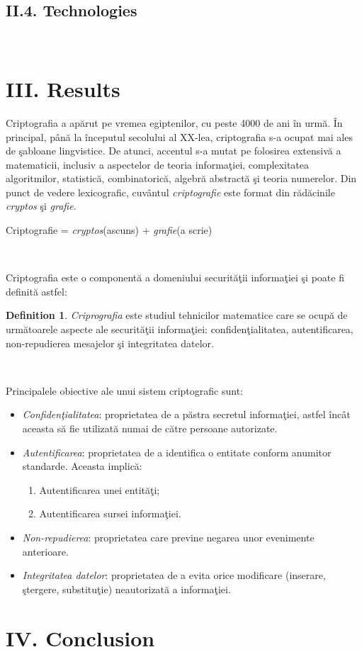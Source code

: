 \documentclass[11pt, a4papper]{report}
\theoremstyle{plain}
\theoremstyle{definition}
\newtheorem{definition}{Definition}
\theoremstyle{definition}
\theoremstyle{proposition}
\begin{document}
\section*{II.4. Technologies}

\

\newpage

\chapter*{III. Results}


Criptografia a apărut pe vremea egiptenilor, cu peste 4000 de ani în urmă. În principal, până la începutul secolului al XX-lea, criptografia s-a ocupat mai ales de şabloane lingvistice. De atunci, accentul s-a mutat pe folosirea extensivă a matematicii, inclusiv a aspectelor de teoria informaţiei, complexitatea algoritmilor, statistică, combinatorică, algebră abstractă şi teoria numerelor. Din punct de vedere lexicografic, cuvântul \textit{criptografie} este format din rădăcinile \textit{cryptos} şi \textit{grafie}.

\begin{center}
Criptografie = \textit{cryptos}(ascuns) + \textit{grafie}(a scrie)
\end{center}
\

Criptografia este o componentă a domeniului securităţii informaţiei şi poate fi definită astfel:

\begin{definition} \textit{Criprografia} este studiul tehnicilor matematice care se ocupă de următoarele aspecte ale securităţii informaţiei: confidenţialitatea, autentificarea, non-repudierea mesajelor şi integritatea datelor.
\end{definition}
\

Principalele obiective ale unui sistem criptografic sunt:
\begin{itemize}
	\item \textit{Confidenţialitatea}: proprietatea de a păstra secretul informaţiei, astfel încât aceasta să fie utilizată numai de către persoane autorizate.
	\item \textit{Autentificarea}: proprietatea de a identifica o entitate conform anumitor standarde. Aceasta implică:		
	\begin{enumerate}
		\item Autentificarea unei entităţi;
		\item Autentificarea sursei informaţiei.
	\end{enumerate}
	\item \textit{Non-repudierea}: proprietatea care previne negarea unor evenimente anterioare.
	\item \textit{Integritatea datelor}: proprietatea de a evita orice modificare (inserare, ştergere, substituţie) neautorizată a informaţiei.
\
\end{itemize}


\newpage

\chapter*{IV. Conclusion}

\nocite{*}



\end{document}
